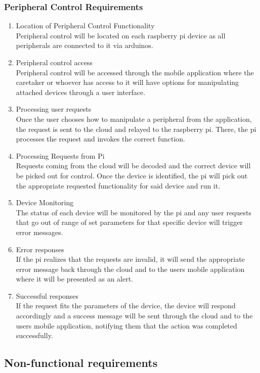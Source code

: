 \documentclass[12pt]{article}
\begin{document}
{{			 \subsubsection{Peripheral Control Requirements}
        	\begin{enumerate}
            	\item{Location of Peripheral Control Functionality\\ Peripheral control will be located on each raspberry pi device as all peripherals are connected to it via arduinos.}
            	\item{Peripheral control access\\Peripheral control will be accessed through the mobile application where the caretaker or whoever has access to it will have options for manipulating attached devices through a user interface.}
                \item{Processing user requests\\Once the user chooses how to manipulate a peripheral from the application, the request is sent to the cloud and relayed to the raspberry pi. There, the pi processes the request and invokes the correct function.}
                \item{Processing Requests from Pi\\ Requests coming from the cloud will be decoded and the correct device will be picked out for control. Once the device is identified, the pi will pick out the appropriate requested functionality for said device and run it.}
                \item{Device Monitoring\\The status of each device will be monitored by the pi and any user requests that go out of range of set parameters for that specific device will trigger error messages.}
                \item{Error responses\\If the pi realizes that the requests are invalid, it will send the appropriate error message back through the cloud and to the users mobile application where it will be presented as an alert.}
                \item{Successful responses\\ If the request fits the parameters of the device, the device will respond accordingly and a success message will be sent through the cloud and to the users mobile application, notifying them that the action was completed successfully.}
            \end{enumerate}
	\subsection{Non-functional requirements}
}}
\end{document}
